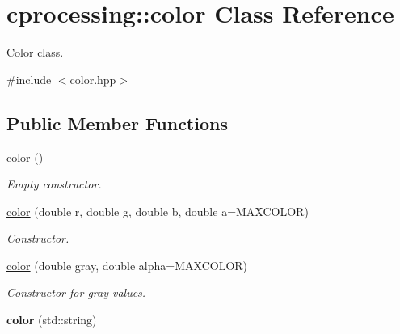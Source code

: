 \hypertarget{classcprocessing_1_1color}{\section{cprocessing\-:\-:color \-Class \-Reference}
\label{classcprocessing_1_1color}
}


\-Color class.  




{\ttfamily \#include $<$color.\-hpp$>$}

\subsection*{\-Public \-Member \-Functions}
\begin{DoxyCompactItemize}
\item 
\hypertarget{classcprocessing_1_1color_a6749dde98dcffcf7d50ea2fa30d316ab}{\hyperlink{classcprocessing_1_1color_a6749dde98dcffcf7d50ea2fa30d316ab}{color} ()}\label{classcprocessing_1_1color_a6749dde98dcffcf7d50ea2fa30d316ab}

\begin{DoxyCompactList}\small\item\em \-Empty constructor. \end{DoxyCompactList}\item 
\hyperlink{classcprocessing_1_1color_afe585293dac64c398d60d12489a701f4}{color} (double r, double g, double b, double a=\-M\-A\-X\-C\-O\-L\-O\-R)
\begin{DoxyCompactList}\small\item\em \-Constructor. \end{DoxyCompactList}\item 
\hypertarget{classcprocessing_1_1color_a7b2a7d243ce51765690b4c33a530d6b3}{\hyperlink{classcprocessing_1_1color_a7b2a7d243ce51765690b4c33a530d6b3}{color} (double gray, double alpha=\-M\-A\-X\-C\-O\-L\-O\-R)}\label{classcprocessing_1_1color_a7b2a7d243ce51765690b4c33a530d6b3}

\begin{DoxyCompactList}\small\item\em \-Constructor for gray values. \end{DoxyCompactList}\item 
\hypertarget{classcprocessing_1_1color_acd5c6367bed9a385bef15d6d504d5ba5}{{\bfseries color} (std\-::string)}\label{classcprocessing_1_1color_acd5c6367bed9a385bef15d6d504d5ba5}


\end{DoxyCompactItemize}
